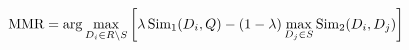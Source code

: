 \documentclass[preview]{standalone}
\begin{document}
\begin{align*}
\special{dvisvgm:raw <g id='unique000'>}\text{MMR} = \arg\max_{D_i \in R \setminus S} \left[ \lambda\,\text{Sim}_1(D_i, Q) - (1-\lambda)\max_{D_j \in S}\text{Sim}_2(D_i, D_j) \right]\special{dvisvgm:raw </g>}
\end{align*}
\end{document}
